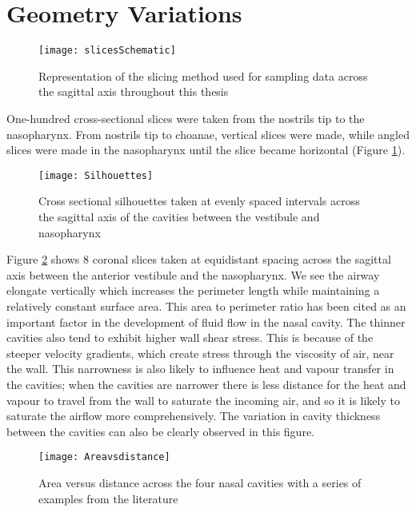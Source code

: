 \section{Geometry Variations}

\begin{figure} 
\centering
\texttt{[image: slicesSchematic]}
\caption{Representation of the slicing method used for sampling data across the sagittal axis throughout this thesis} 
\label{fig:Slices}
\end{figure}

One-hundred cross-sectional slices were taken from the nostrils tip to the nasopharynx. From nostrils tip to choanae, vertical slices were made, while angled slices were made in the nasopharynx until the slice became horizontal (Figure \ref{fig:Slices}).

\begin{figure} 
  \texttt{[image: Silhouettes]}
  \caption{Cross sectional silhouettes taken at evenly spaced intervals across the sagittal axis of  the cavities between the vestibule and nasopharynx}
  \label{fig:sil}

\end{figure}
Figure \ref{fig:sil} shows 8 coronal slices taken at equidistant spacing across the sagittal axis between the anterior vestibule and the nasopharynx. We see the airway elongate vertically which increases the perimeter length while maintaining a relatively constant surface area. This area to perimeter ratio has been cited as an important factor in the development of fluid flow in the nasal cavity. The thinner cavities also tend to exhibit higher wall shear stress. This is because of the steeper velocity gradients, which create stress through the viscosity of air, near the wall. This narrowness is also likely to influence heat and vapour transfer in the cavities; when the cavities are narrower there is less distance for the heat and vapour to travel from the wall to saturate the incoming air, and so it is likely to saturate the airflow more comprehensively. The variation in cavity thickness between the cavities can also be clearly observed in this figure.

\begin{figure}
  \texttt{[image: Areavsdistance]}
  \caption{Area versus distance across the four nasal cavities with a series of examples from the literature}
  \label{fig:area}
\end{figure}

